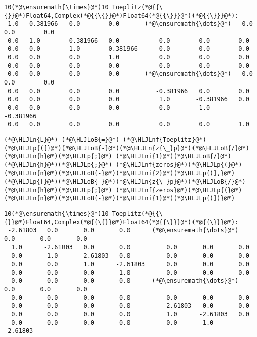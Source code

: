 \documentclass[12pt,landscape]{article}
\newcommand{\HLJLn}[1]{#1}
\newcommand{\HLJLnf}[1]{\textcolor[RGB]{66,102,213}{#1}}
\newcommand{\HLJLni}[1]{\textcolor[RGB]{59,151,46}{#1}}
\newcommand{\HLJLoB}[1]{\textcolor[RGB]{102,102,102}{\textbf{#1}}}
\newcommand{\HLJLp}[1]{#1}
\begin{document}
{\begin{lstlisting}
\end{lstlisting}
{\Large
\begin{lstlisting}
10(*@\ensuremath{\times}@*)10 Toeplitz(*@{{\{}}@*)Float64,Complex(*@{{\{}}@*)Float64(*@{{\}}}@*)(*@{{\}}}@*):
 1.0  -0.381966   0.0        0.0       (*@\ensuremath{\dots}@*)   0.0        0.0        0.0     
 0.0   1.0       -0.381966   0.0           0.0        0.0        0.0     
 0.0   0.0        1.0       -0.381966      0.0        0.0        0.0     
 0.0   0.0        0.0        1.0           0.0        0.0        0.0     
 0.0   0.0        0.0        0.0           0.0        0.0        0.0     
 0.0   0.0        0.0        0.0       (*@\ensuremath{\dots}@*)   0.0        0.0        0.0     
 0.0   0.0        0.0        0.0          -0.381966   0.0        0.0     
 0.0   0.0        0.0        0.0           1.0       -0.381966   0.0     
 0.0   0.0        0.0        0.0           0.0        1.0       -0.381966
 0.0   0.0        0.0        0.0           0.0        0.0        1.0
\end{lstlisting}}


\begin{lstlisting}
(*@\HLJLn{L}@*) (*@\HLJLoB{=}@*) (*@\HLJLnf{Toeplitz}@*)(*@\HLJLp{([}@*)(*@\HLJLoB{-}@*)(*@\HLJLn{z{\_}p}@*)(*@\HLJLoB{/}@*)(*@\HLJLn{h}@*)(*@\HLJLp{;}@*) (*@\HLJLni{1}@*)(*@\HLJLoB{/}@*)(*@\HLJLn{h}@*)(*@\HLJLp{;}@*) (*@\HLJLnf{zeros}@*)(*@\HLJLp{(}@*)(*@\HLJLn{n}@*)(*@\HLJLoB{-}@*)(*@\HLJLni{2}@*)(*@\HLJLp{)],}@*) (*@\HLJLp{[}@*)(*@\HLJLoB{-}@*)(*@\HLJLn{z{\_}p}@*)(*@\HLJLoB{/}@*)(*@\HLJLn{h}@*)(*@\HLJLp{;}@*) (*@\HLJLnf{zeros}@*)(*@\HLJLp{(}@*)(*@\HLJLn{n}@*)(*@\HLJLoB{-}@*)(*@\HLJLni{1}@*)(*@\HLJLp{)])}@*)
\end{lstlisting}

{\Large
\begin{lstlisting}
10(*@\ensuremath{\times}@*)10 Toeplitz(*@{{\{}}@*)Float64,Complex(*@{{\{}}@*)Float64(*@{{\}}}@*)(*@{{\}}}@*):
 -2.61803   0.0       0.0       0.0      (*@\ensuremath{\dots}@*)   0.0       0.0       0.0    
  1.0      -2.61803   0.0       0.0          0.0       0.0       0.0    
  0.0       1.0      -2.61803   0.0          0.0       0.0       0.0    
  0.0       0.0       1.0      -2.61803      0.0       0.0       0.0    
  0.0       0.0       0.0       1.0          0.0       0.0       0.0    
  0.0       0.0       0.0       0.0      (*@\ensuremath{\dots}@*)   0.0       0.0       0.0    
  0.0       0.0       0.0       0.0          0.0       0.0       0.0    
  0.0       0.0       0.0       0.0         -2.61803   0.0       0.0    
  0.0       0.0       0.0       0.0          1.0      -2.61803   0.0    
  0.0       0.0       0.0       0.0          0.0       1.0      -2.61803
\end{lstlisting}}


}
\end{document}
